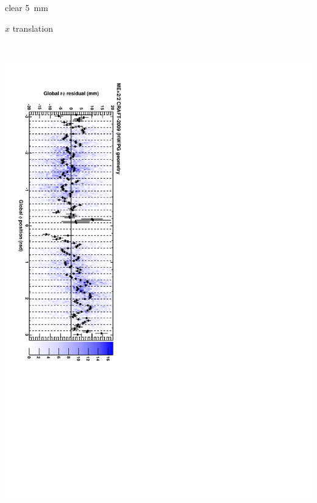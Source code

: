 \documentclass[compress]{beamer}
\begin{document}
\begin{frame}
\vspace{-2.2 cm}
\hfill clear 5~mm

\hfill $x$ translation

\vspace{2.2 cm}
\vspace{-\baselineskip}
\vspace{-\baselineskip}
\vspace{-\baselineskip}
\vspace{-\baselineskip}
\mbox{ }
\end{frame}

\begin{frame}
\vspace{1 cm}
\includegraphics[height=\linewidth, angle=90]{series12.pdf}


\end{frame}
\end{document}
